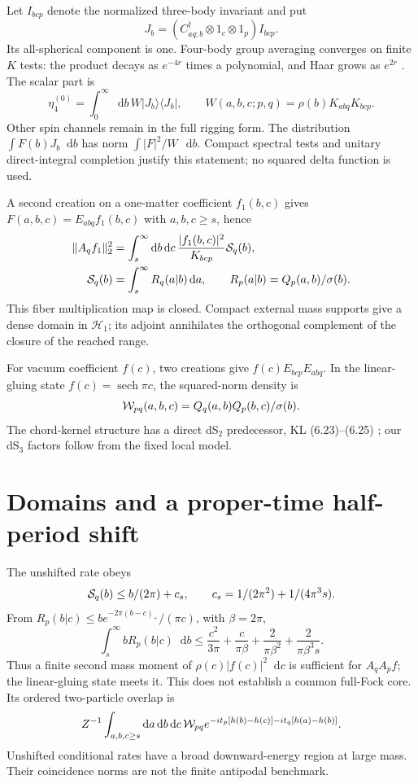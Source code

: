 \documentclass[11pt,a4paper]{article}
\newcommand{\dd}{\mathop{}\!\mathrm d}
\newcommand{\sech}{\operatorname{sech}}
\newcommand{\HH}{\mathcal H}
\begin{document}
Let $I_{bcp}$ denote the normalized three-body invariant and put
\[
 J_b=(C_{aq;b}^{\dagger}\otimes1_c\otimes1_p)I_{bcp}.
\]
Its all-spherical component is one. Four-body group averaging converges
on finite $K$ tests: the product decays as $e^{-4r}$ times a polynomial,
and Haar grows as $e^{2r}$ \cite{MM,MY}. The scalar part is
\begin{equation}
 \eta_4^{(0)}=\int_0^\infty \dd b\,W|J_b\rangle\langle J_b|,
 \qquad W(a,b,c;p,q)=\rho(b)K_{abq}K_{bcp}.
\end{equation}
Other spin channels remain in the full rigging form.
The distribution $\int F(b)J_b\dd b$ has norm $\int |F|^2/W\,\dd b$.
Compact spectral tests and unitary direct-integral completion justify
this statement; no squared delta function is used.

A second creation on a one-matter coefficient $f_1(b,c)$ gives
$F(a,b,c)=E_{abq}f_1(b,c)$ with $a,b,c\ge s$, hence
\begin{align}
 \|A_qf_1\|_2^2&=\int_s^\infty\dd b\dd c\,
       \frac{|f_1(b,c)|^2}{K_{bcp}}{\cal S}_q(b),\\
 {\cal S}_q(b)&=\int_s^\infty R_q(a|b)\dd a,\qquad
 R_p(a|b)=Q_p(a,b)/\sigma(b).
\end{align}
This fiber multiplication map is closed. Compact external mass supports
give a dense domain in $\HH_1$; its adjoint annihilates the orthogonal
complement of the closure of the reached range.

For vacuum coefficient $f(c)$, two creations give
$f(c)E_{bcp}E_{abq}$. In the linear-gluing state $f(c)=\sech\pi c$,
the squared-norm density is
\begin{equation}
 {\cal W}_{pq}(a,b,c)=Q_q(a,b)Q_p(b,c)/\sigma(b).
\end{equation}
The chord-kernel structure has a direct dS$_2$ predecessor,
KL (6.23)--(6.25) \cite{KL}; our dS$_3$ factors follow from the fixed local model.

\newpage
\section{Domains and a proper-time half-period shift}
The unshifted rate obeys
\[
 {\cal S}_q(b)\le b/(2\pi)+c_s,\qquad
 c_s=1/(2\pi^2)+1/(4\pi^3s).
\]
From $R_p(b|c)\le b e^{-2\pi(b-c)_+}/(\pi c)$, with $\beta=2\pi$,
\begin{equation}
 \int_s^\infty bR_p(b|c)\dd b\le
 \frac{c^2}{3\pi}+\frac{c}{\pi\beta}
 +\frac2{\pi\beta^2}+\frac2{\pi\beta^3s}.
\end{equation}
Thus a finite second mass moment of $\rho(c)|f(c)|^2\dd c$ is sufficient
for $A_qA_pf$; the linear-gluing state meets it.
This does not establish a common full-Fock core.
Its ordered two-particle overlap is
\[
 Z^{-1}\int_{a,b,c\ge s}\dd a\dd b\dd c\,{\cal W}_{pq}
 e^{-it_p[h(b)-h(c)]-it_q[h(a)-h(b)]}.
\]
Unshifted conditional rates have a broad downward-energy region at large
mass. Their coincidence norms are not the finite antipodal benchmark.
\end{document}
